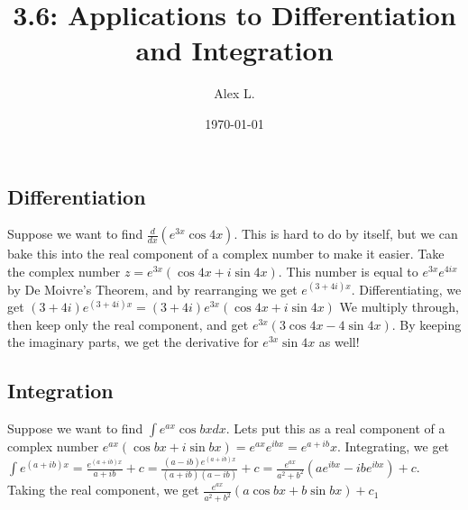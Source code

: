 \documentclass{article}
\title{3.6: Applications to Differentiation and Integration}
\author{Alex L.}
\date{\today}
\begin{document}
\maketitle

\subsection{Differentiation}

Suppose we want to find $\frac{d}{dx} (e^{3x} \cos 4x)$. This is hard to do by itself, but we can bake this into the real component of a complex number to make it easier. Take the complex number $z = e^{3x}(\cos 4x + i\sin 4x)$. This number is equal to $e^{3x}e^{4ix}$ by De Moivre's Theorem, and by rearranging we get $e^{(3+4i)x}$. Differentiating, we get $(3+4i)e^{(3+4i)x} = (3+4i)e^{3x}(\cos 4x + i\sin 4x)$ We multiply through, then keep only the real component, and get $e^{3x}(3\cos 4x - 4\sin 4x)$. By keeping the imaginary parts, we get the derivative for $e^{3x} \sin 4x$ as well!

\subsection{Integration}

Suppose we want to find $\int e^{ax} \cos bx dx$. Lets put this as a real component of a complex number $e^{ax}(\cos bx + i\sin bx) = e^{ax}e^{ibx} = e^{a+ib}x$. Integrating, we get $\int e^{(a+ib)x} = \frac{e^{(a+ib)x}}{a+ib} + c = \frac{(a-ib) e^{(a+ib)x}}{(a+ib)(a-ib)} + c = \frac{e^{ax}}{a^2 + b^2}(ae^{ibx} - ibe^{ibx}) + c$. Taking the real component, we get $\frac{e^{ax}}{a^2 + b^2}(a\cos bx + b\sin bx) + c_1$
\end{document}
